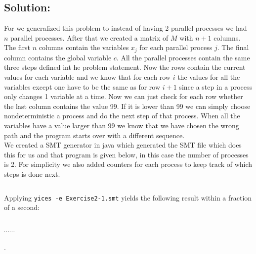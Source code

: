 \documentclass[12pt]{article}
\begin{document}
\subsection*{Solution:}
For we generalized this problem to instead of having 2 parallel processes we had $n$ parallel processes. After that we created a matrix of $M$ with $n+1$ columns. The first $n$ columns contain the variables $x_j$ for each parallel process $j$. The final column contains the global variable $c$. All the parallel processes contain the same three steps defined int he problem statement. Now the rows contain the current values for each variable and we know that for each row $i$ the values for all the variables except one have to be the same as for row $i+1$ since a step in a process only changes 1 variable at  a time. 
Now we can just check for each row whether the last column contains the value 99. If it is lower than 99 we can simply choose nondeterministic a process and do the next step of that process. When all the variables have a value larger than 99 we know that we have chosen the wrong path and the program starts over with a different sequence. \\
 We created a SMT generator in java which generated the SMT file which does this for us and that program is given below, in this case the number of processes is 2. For simplicity we also added counters for each process to keep track of which steps is done next.

{\footnotesize
\begin{verbatim}

\end{verbatim}
}

\noindent Applying {\tt yices -e Exercise2-1.smt} yields the following result
within a fraction of a second:

{\footnotesize
\begin{verbatim}

\end{verbatim}

$\cdots \cdots$ }.
\end{document}
